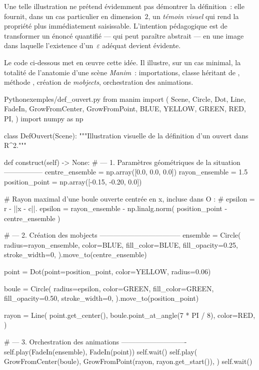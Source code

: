 \documentclass[12pt, a4paper, openany]{report}
\begin{document}
	\begin{remarque}
		Une telle illustration ne prétend évidemment pas démontrer la définition~: elle fournit, dans un cas particulier en dimension~$2$, un \emph{témoin visuel} qui rend la propriété plus immédiatement saisissable. L’intention pédagogique est de transformer un énoncé quantifié — qui peut paraître abstrait — en une image dans laquelle l’existence d’un~$\varepsilon$ adéquat devient évidente.
	\end{remarque}

	Le code ci-dessous met en œuvre cette idée. Il illustre, sur un cas minimal, la totalité de l’anatomie d’une scène \textit{Manim}~: importations, classe héritant de , méthode , création de \emph{mobjects}, orchestration des animations.

	\begin{codefile}{Python}{exemples/def\_ouvert.py}
from manim import (
    Scene, Circle, Dot, Line,
    FadeIn, GrowFromCenter, GrowFromPoint,
    BLUE, YELLOW, GREEN, RED, PI,
)
import numpy as np


class DefOuvert(Scene):
    """Illustration visuelle de la définition d'un ouvert dans R^2."""

    def construct(self) -> None:
        # --- 1. Paramètres géométriques de la situation -----------------
        centre_ensemble = np.array([0.0, 0.0, 0.0])
        rayon_ensemble = 1.5
        position_point = np.array([-0.15, -0.20, 0.0])

        # Rayon maximal d'une boule ouverte centrée en x, incluse dans O :
        # epsilon = r - ||x - c||.
        epsilon = rayon_ensemble - np.linalg.norm(
            position_point - centre_ensemble
        )

        # --- 2. Création des mobjects -----------------------------------
        ensemble = Circle(
            radius=rayon_ensemble,
            color=BLUE,
            fill_color=BLUE,
            fill_opacity=0.25,
            stroke_width=0,
        ).move_to(centre_ensemble)

        point = Dot(point=position_point, color=YELLOW, radius=0.06)

        boule = Circle(
            radius=epsilon,
            color=GREEN,
            fill_color=GREEN,
            fill_opacity=0.50,
            stroke_width=0,
        ).move_to(position_point)

        rayon = Line(
            point.get_center(),
            boule.point_at_angle(7 * PI / 8),
            color=RED,
        )

        # --- 3. Orchestration des animations ----------------------------
        self.play(FadeIn(ensemble), FadeIn(point))
        self.wait()
        self.play(
            GrowFromCenter(boule),
            GrowFromPoint(rayon, rayon.get_start()),
        )
        self.wait()
	\end{codefile}
\end{document}
